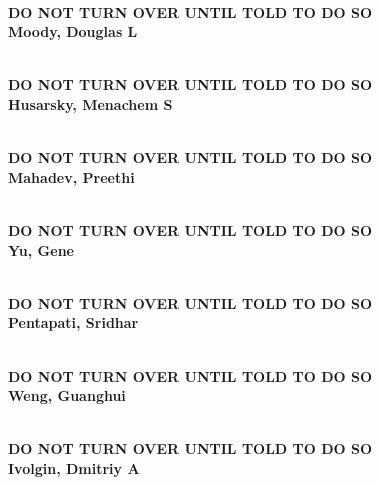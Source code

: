 \documentclass[11pt]{article}
\begin{document}
\begin{center}
{\Large\bf
\mbox{\ }\\
\vspace{1in}
DO NOT TURN OVER UNTIL TOLD TO DO SO\\
\vspace{1in}
Moody, Douglas L
}
\end{center}
\newpage

\begin{center}
{\Large\bf
\mbox{\ }\\
\vspace{1in}
DO NOT TURN OVER UNTIL TOLD TO DO SO\\
\vspace{1in}
Husarsky, Menachem S
}
\end{center}
\newpage

\begin{center}
{\Large\bf
\mbox{\ }\\
\vspace{1in}
DO NOT TURN OVER UNTIL TOLD TO DO SO\\
\vspace{1in}
Mahadev, Preethi
}
\end{center}
\newpage

\begin{center}
{\Large\bf
\mbox{\ }\\
\vspace{1in}
DO NOT TURN OVER UNTIL TOLD TO DO SO\\
\vspace{1in}
Yu, Gene
}
\end{center}
\newpage

\begin{center}
{\Large\bf
\mbox{\ }\\
\vspace{1in}
DO NOT TURN OVER UNTIL TOLD TO DO SO\\
\vspace{1in}
Pentapati, Sridhar
}
\end{center}
\newpage

\begin{center}
{\Large\bf
\mbox{\ }\\
\vspace{1in}
DO NOT TURN OVER UNTIL TOLD TO DO SO\\
\vspace{1in}
Weng, Guanghui
}
\end{center}
\newpage

\begin{center}
{\Large\bf
\mbox{\ }\\
\vspace{1in}
DO NOT TURN OVER UNTIL TOLD TO DO SO\\
\vspace{1in}
Ivolgin, Dmitriy A
}
\end{center}
\newpage
\end{document}
